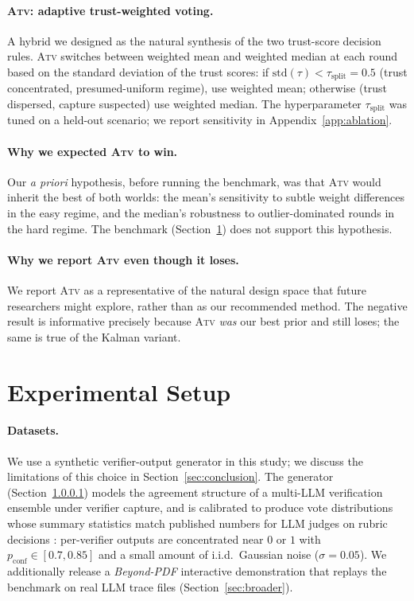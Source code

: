 \documentclass[11pt]{article}
\begin{document}
\paragraph{\textsc{Atv}: adaptive trust-weighted voting.}
\label{sub:atv}
A hybrid we designed as the natural synthesis of the two trust-score
decision rules. \textsc{Atv} switches between weighted mean and
weighted median at each round based on the standard deviation of the
trust scores: if $\text{std}(\tau) < \tau_{\text{split}} = 0.5$ (trust
concentrated, presumed-uniform regime), use weighted mean; otherwise
(trust dispersed, capture suspected) use weighted median. The
hyperparameter $\tau_{\text{split}}$ was tuned on a held-out scenario;
we report sensitivity in Appendix~\ref{app:ablation}.

\paragraph{Why we expected \textsc{Atv} to win.}
Our \emph{a priori} hypothesis, before running the benchmark, was that
\textsc{Atv} would inherit the best of both worlds: the mean's
sensitivity to subtle weight differences in the easy regime, and the
median's robustness to outlier-dominated rounds in the hard regime.
The benchmark (Section~\ref{sec:exp}) does not support this hypothesis.

\paragraph{Why we report \textsc{Atv} even though it loses.}
We report \textsc{Atv} as a representative of the natural design space
that future researchers might explore, rather than as our recommended
method. The negative result is informative precisely because \textsc{Atv}
\emph{was} our best prior and still loses; the same is true of the
Kalman variant.

\section{Experimental Setup}
\label{sec:exp}

\paragraph{Datasets.}
\label{sub:generator}
We use a synthetic verifier-output generator in this study; we discuss
the limitations of this choice in Section~\ref{sec:conclusion}. The
generator (Section~\ref{sub:generator}) models the agreement structure
of a multi-LLM verification ensemble under verifier capture, and is
calibrated to produce vote distributions whose summary statistics
match published numbers for LLM judges on rubric decisions
\citep{leung2026rubricllm}: per-verifier outputs are concentrated
near $0$ or $1$ with $p_{\text{conf}} \in [0.7, 0.85]$ and a small
amount of i.i.d.\ Gaussian noise ($\sigma = 0.05$). We additionally
release a \emph{Beyond-PDF} interactive demonstration that replays
the benchmark on real LLM trace files
(Section~\ref{sec:broader}).
\end{document}
